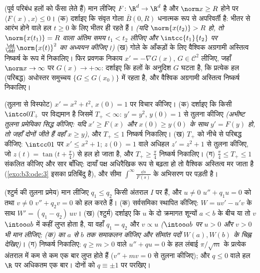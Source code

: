 \begin{exercise}[$\star\star\star$]\label{exo:b3:ode:10}
(पूर्व परिबंध हलों को फँसा लेते हैं) मान लीजिए $F \colon \R^d \to \R^d$  है और $\norm x \geq R$ होने पर $\langle F(x), x\rangle \leq 0$।
(क) दर्शाइए कि संवृत गोला $\bar B(0, R)$ धनात्मक रूप से अपरिवर्ती है:
भीतर से आरंभ होने वाले हल $t \geq
0$ के लिए भीतर ही रहते हैं।
\emph{(यदि $\norm{x(t_2)} > R$ हो, तो $\norm{x(t_1)} = R$ वाला अंतिम समय $t_1 < t_2$ लीजिए और
$\intcc{t_1}{t_2}$ पर $\frac{\dd}{\dd t}\norm{x(t)}^2$ का अध्ययन कीजिए।)}
(ख) गोले के आँकड़ों के लिए वैश्विक अग्रगामी अस्तित्व निष्कर्ष के
रूप में निकालिए। फिर प्रवणक निकाय $x' = -\nabla G(x)$, $G \in
\mathcal C^2$ लीजिए, जहाँ $\norm x \to
\infty$
पर $G(x) \to +\infty$: दर्शाइए कि हलों के अनुदिश $G$ घटता है, कि प्रत्येक
हल (परिबद्ध) अधोस्तर समुच्चय $\{G \leq
G(x_0)\}$ में रहता है, और वैश्विक
अग्रगामी अस्तित्व निष्कर्ष निकालिए।
\end{exercise}

\begin{exercise}[$\star\star$]\label{exo:b3:ode:11}
(तुलना से विस्फोट) $x' = x^2 + t^2$, $x(0) =
1$ पर विचार कीजिए।
(क) दर्शाइए कि  किसी $\intco0{T_+}$ पर विद्यमान है जिसमें $T_+ < \infty$:
$y' = y^2$, $y(0) = 1$ से तुलना कीजिए \emph{(अभीष्ट तुलना प्रमेयिका सिद्ध
कीजिए: यदि $x' \geq
F(x)$ और $x(0) \geq y(0)$ के साथ $y' = F(y)$ हो, तो जहाँ दोनों जीते हैं
वहाँ $x \geq
y$)}, और $T_+ \leq 1$ निष्कर्ष निकालिए।
(ख) $T_+$ को नीचे से परिबद्ध कीजिए: $\intcc01$ पर $x' \leq x^2 +
1$; $z(0) =
1$ वाले
अधिहल $z' = z^2 + 1$ से तुलना कीजिए, जो $z(t) = \tan\bigl(t + \frac\pi4\bigr)$ से हल हो जाता है, और $T_+ \geq \frac\pi4$
निष्कर्ष निकालिए।
(ग) $\frac\pi4 \leq T_+ \leq 1$ संकलित कीजिए और सार बाँधिए: दायाँ पक्ष अधिरैखिक रूप से
बढ़ता हो तो वैश्विक अस्तित्व मर जाता है (\cref{exo:b3:ode:3} इसका प्रतिबिंदु
है), और सीमा $\int^{\infty}\frac{\dd s}{F(s)}$ के अभिसरण पर पड़ती है।
\end{exercise}

\begin{exercise}[$\star\star\star$]\label{exo:b3:ode:12}
(श्टुर्म की तुलना प्रमेय) मान लीजिए $q_1 \leq q_2$ किसी अंतराल $I$ पर
 हैं, और $u \neq 0$ $u''
+ q_1u = 0$ को तथा $v \neq 0$ $v'' + q_2v = 0$ को हल करते हैं।
(क)  सर्वसमिका स्थापित कीजिए: $W = uv' - u'v$ के साथ $W' = (q_1 - q_2)\,uv$।
(ख) (श्टुर्म) दर्शाइए कि $u$ के दो क्रमागत शून्यों $a < b$ के बीच
या तो $v$ $\intoo ab$ में कहीं लुप्त होता है, या वहाँ $q_1 = q_2$ और $v \propto u$
\emph{($\intoo ab$ पर $u > 0$ और $v > 0$ भी मान लीजिए; (क) का $a$ से
$b$ तक समाकलन कीजिए और सीमांत पदों $W(a),
W(b)$ के चिह्न देखिए)}।
(ग) निष्कर्ष निकालिए: $q \geq m > 0$ वाले $u'' + qu = 0$ के हल लंबाई $\pi/\sqrt m$ के
प्रत्येक अंतराल में कम से कम एक बार लुप्त होते हैं ($v'' + mv = 0$ से
तुलना कीजिए); और $q \leq 0$ वाले हल $\R$ पर अधिकतम एक बार। दोनों को
$q \equiv \pm1$ पर परखिए।
\end{exercise}

